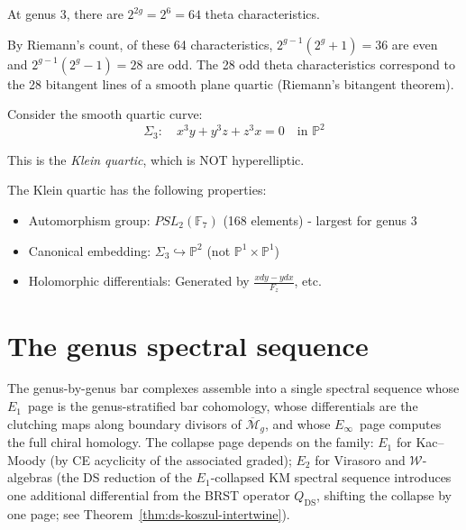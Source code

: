 \begin{theorem}
\label{thm:theta-g3}
At genus 3, there are $2^{2g} = 2^6 = 64$ theta characteristics.

By Riemann's count, of these 64 characteristics, $2^{g-1}(2^g+1) = 36$ are even and $2^{g-1}(2^g-1) = 28$ are odd. The 28 odd theta characteristics correspond to the 28 bitangent lines of a smooth plane quartic (Riemann's bitangent theorem).
\end{theorem}

\begin{example}
\label{ex:klein-quartic-g3}
Consider the smooth quartic curve:
\begin{equation}
\Sigma_3: \quad x^3 y + y^3 z + z^3 x = 0 \quad \text{in } \mathbb{P}^2
\end{equation}

This is the \emph{Klein quartic}, which is NOT hyperelliptic.

The Klein quartic has the following properties:
\begin{itemize}
\item Automorphism group: $PSL_2(\mathbb{F}_7)$ (168 elements) - largest for genus 3
\item Canonical embedding: $\Sigma_3 \hookrightarrow \mathbb{P}^2$ (not $\mathbb{P}^1 \times \mathbb{P}^1$)
\item Holomorphic differentials: Generated by $\frac{x dy - y dx}{F_z}$, etc.
\end{itemize}
\end{example}

\section{The genus spectral sequence}
\label{sec:genus-spectral-complete}

The genus-by-genus bar complexes assemble into a single spectral sequence whose
$E_1$~page is the genus-stratified bar cohomology, whose
differentials are the clutching maps along boundary divisors of
$\overline{\mathcal{M}}_g$, and whose $E_\infty$~page computes
the full chiral homology.  The collapse page depends on the
family: $E_1$ for Kac--Moody (by CE acyclicity of the
associated graded); $E_2$ for Virasoro and $\mathcal{W}$-algebras
(the DS reduction of the $E_1$-collapsed KM spectral sequence
introduces one additional differential from the BRST operator
$Q_{\mathrm{DS}}$, shifting the collapse by one page;
see Theorem~\ref{thm:ds-koszul-intertwine}).

